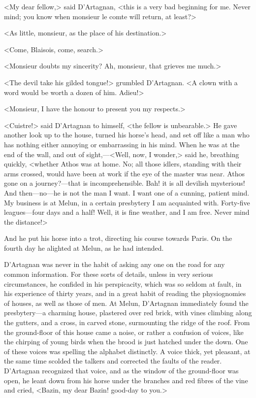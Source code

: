 <My dear fellow,> said D'Artagnan, <this is a very bad beginning for me. Never mind; you know when monsieur le comte will return, at least?>

<As little, monsieur, as the place of his destination.>

<Come, Blaisois, come, search.>

<Monsieur doubts my sincerity? Ah, monsieur, that grieves me much.>

<The devil take his gilded tongue!> grumbled D'Artagnan. <A clown with a word would be worth a dozen of him. Adieu!>

<Monsieur, I have the honour to present you my respects.>

<Cuistre!> said D'Artagnan to himself, <the fellow is unbearable.> He gave another look up to the house, turned his horse's head, and set off like a man who has nothing either annoying or embarrassing in his mind. When he was at the end of the wall, and out of sight,—<Well, now, I wonder,> said he, breathing quickly, <whether Athos was at home. No; all those idlers, standing with their arms crossed, would have been at work if the eye of the master was near. Athos gone on a journey?—that is incomprehensible. Bah! it is all devilish mysterious! And then—no—he is not the man I want. I want one of a cunning, patient mind. My business is at Melun, in a certain presbytery I am acquainted with. Forty-five leagues—four days and a half! Well, it is fine weather, and I am free. Never mind the distance!>

And he put his horse into a trot, directing his course towards Paris. On the fourth day he alighted at Melun, as he had intended.

D'Artagnan was never in the habit of asking any one on the road for any common information. For these sorts of details, unless in very serious circumstances, he confided in his perspicacity, which was so seldom at fault, in his experience of thirty years, and in a great habit of reading the physiognomies of houses, as well as those of men. At Melun, D'Artagnan immediately found the presbytery—a charming house, plastered over red brick, with vines climbing along the gutters, and a cross, in carved stone, surmounting the ridge of the roof. From the ground-floor of this house came a noise, or rather a confusion of voices, like the chirping of young birds when the brood is just hatched under the down. One of these voices was spelling the alphabet distinctly. A voice thick, yet pleasant, at the same time scolded the talkers and corrected the faults of the reader. D'Artagnan recognized that voice, and as the window of the ground-floor was open, he leant down from his horse under the branches and red fibres of the vine and cried, <Bazin, my dear Bazin! good-day to you.>

